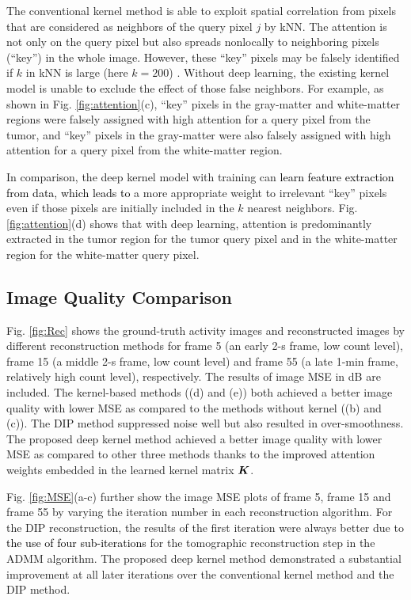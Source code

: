 \documentclass[]{IEEETran}
\newcommand{\txtb}[1]{\textcolor{black}{#1}}
\begin{document}
	The conventional kernel method \cite{Wang2015} is able to exploit spatial correlation from pixels that are considered as neighbors of the query pixel $j$ by kNN. The attention is not only on the query pixel but also spreads nonlocally to neighboring pixels (``key'') in the whole image. However, these ``key'' pixels may be falsely identified if $k$ in kNN is large (here $k=200$) \cite{Wang2015}. Without deep learning, the existing kernel model is unable to exclude the effect of those false neighbors. For example, as shown in Fig. \ref{fig:attention}(c), ``key'' pixels in the gray-matter and white-matter regions were falsely assigned with high attention for a query pixel from the tumor, and ``key'' pixels in the gray-matter were also falsely assigned with high attention for a query pixel from the white-matter region. 
	
	In comparison, the deep kernel model with training can \txtb{learn feature extraction from data, which leads to} a more appropriate weight to irrelevant ``key'' pixels even if those pixels are initially included in the $k$ nearest neighbors. Fig. \ref{fig:attention}(d) shows that with deep learning, attention is predominantly extracted in the tumor region for the tumor query pixel and in the white-matter region for the white-matter query pixel.
	
	\subsection{Image Quality Comparison}
	Fig. \ref{fig:Rec} shows the ground-truth activity images and reconstructed images by different reconstruction methods for frame 5 (an early 2-s frame, low count level), frame 15 (a middle 2-s frame, low count level) and frame 55 (a late 1-min frame, relatively high count level), respectively. The results of image MSE in dB are included. The kernel-based methods ((d) and (e)) both achieved a better image quality with lower MSE as compared to the methods without kernel ((b) and (c)). The DIP method \cite{Gong2019} suppressed noise well but also resulted in
	over-smoothness. The proposed deep kernel method achieved a better image quality with lower MSE as compared to other three methods thanks to the \txtb{improved} attention weights embedded in the learned kernel matrix $\bm{K}$.
	
	Fig. \ref{fig:MSE}(a-c) further show the image MSE plots of frame 5, frame 15 and frame 55 by varying the iteration number in each reconstruction algorithm. For the DIP reconstruction, the results of the first iteration were always better due to \txtb{the use of four sub-iterations} for the tomographic reconstruction step in the ADMM algorithm. The proposed deep kernel method demonstrated a substantial improvement at all later iterations over the conventional kernel method and the DIP method.
	
\end{document}
